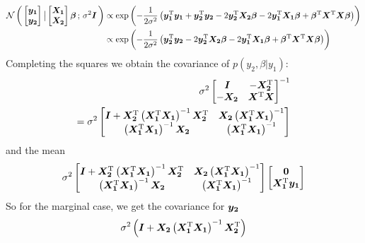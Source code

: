 \documentclass[twoside]{article}
\begin{document}
\begin{align*}
\mathcal{N}\left(\, { {
\begin{bmatrix}
\bm{y_1}\\
\bm{y_2}
\end{bmatrix}
} \, \big| \, {
\begin{bmatrix}
\bm{X_1}\\
\bm{X_2}
\end{bmatrix}    
\bm{\beta}
} } \,;\, { {
\sigma^2
\bm{I}
} } \,\right)
&\propto
\exp\left(
-\frac{1}{2\sigma^2}\left(
\bm{y_1}^\mathrm{T}\bm{y_1}  + \bm{y_2}^\mathrm{T}\bm{y_2}
-2\bm{y_2}^\mathrm{T}\bm{X_2}\bm{\beta}-2\bm{y_1}^\mathrm{T}\bm{X_1}\bm{\beta}+\bm{\beta}^\mathrm{T}\bm{X}^\mathrm{T}\bm{X}\bm{\beta}
\right)
\right)
\\
&\propto
\exp\left(
-\frac{1}{2\sigma^2}\left(
\bm{y_2}^\mathrm{T}\bm{y_2}
-2\bm{y_2}^\mathrm{T}\bm{X_2}\bm{\beta}-2\bm{y_1}^\mathrm{T}\bm{X_1}\bm{\beta}+\bm{\beta}^\mathrm{T}\bm{X}^\mathrm{T}\bm{X}\bm{\beta}
\right)
\right)
\end{align*}
Completing the squares we obtain the covariance of $p(y_2,\beta|y_1)$:
\begin{align*}
\sigma^2
\begin{bmatrix}
\bm{I}
&
-\bm{X_2}^\mathrm{T}
\\
-\bm{X_2}
&
\bm{X}^\mathrm{T}\bm{X}
\end{bmatrix}^{-1}
\\=
\sigma^2
\begin{bmatrix}
\bm{I} + \bm{X_2}^\mathrm{T}\left(\bm{X_1}^\mathrm{T}\bm{X_1}\right)^{-1}\bm{X_2}^\mathrm{T}
&
\bm{X_2}\left(\bm{X_1}^\mathrm{T}\bm{X_1}\right)^{-1}
\\
\left(\bm{X_1}^\mathrm{T}\bm{X_1}\right)^{-1}\bm{X_2}
&
\left(\bm{X_1}^\mathrm{T}\bm{X_1}\right)^{-1}
\end{bmatrix}
\end{align*}
and the mean
\begin{align*}
\sigma^2
\begin{bmatrix}
\bm{I} + \bm{X_2}^\mathrm{T}\left(\bm{X_1}^\mathrm{T}\bm{X_1}\right)^{-1}\bm{X_2}^\mathrm{T}
&
\bm{X_2}\left(\bm{X_1}^\mathrm{T}\bm{X_1}\right)^{-1}
\\
\left(\bm{X_1}^\mathrm{T}\bm{X_1}\right)^{-1}\bm{X_2}
&
\left(\bm{X_1}^\mathrm{T}\bm{X_1}\right)^{-1}
\end{bmatrix}
\begin{bmatrix}
\bm{0}
\\
\bm{X_1}^\mathrm{T}\bm{y_1}
\end{bmatrix}
\end{align*}
So for the marginal case, we get the covariance for $\bm{y_2}$
\begin{align*}
\sigma^2
\left(
\bm{I} + \bm{X_2}\left(
\bm{X_1}^\mathrm{T}
\bm{X_1}
\right)^{-1}\bm{X_2}^\mathrm{T}
\right)
\end{align*}
\end{document}
